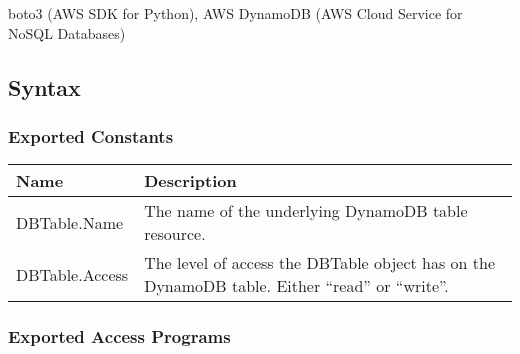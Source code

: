 \documentclass[12pt, titlepage]{article}
\begin{document}
boto3 (AWS SDK for Python), AWS DynamoDB (AWS Cloud Service for NoSQL Databases)

\subsection{Syntax}

\subsubsection{Exported Constants}

\begin{center}
  \begin{tabular}{p{4cm} p{12cm}}
    \hline
    \textbf{Name} & \textbf{Description} \\
    \hline
    DBTable.Name & The name of the underlying DynamoDB table resource. \\
    \hline
    DBTable.Access & The level of access the DBTable object has on
    the DynamoDB table. Either ``read'' or ``write''. \\
    \hline
  \end{tabular}
\end{center}

\subsubsection{Exported Access Programs}
\end{document}
